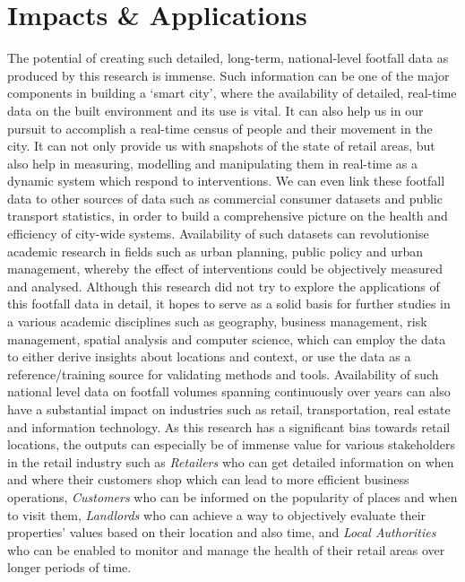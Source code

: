 \section{Impacts \& Applications}
The potential of creating such detailed, long-term, national-level footfall data as produced by this research is immense.
Such information can be one of the major components in building a `smart city', where the availability of detailed, real-time data on the built environment and its use is vital.
It can also help us in our pursuit to accomplish a real-time census of people and their movement in the city.
It can not only provide us with snapshots of the state of  retail areas, but also help in measuring, modelling and manipulating them in real-time as a dynamic system which respond to interventions.
We can even link these footfall data to other sources of data such as commercial consumer datasets and public transport statistics, in order to build a comprehensive picture on the health and efficiency of city-wide systems.
Availability of such datasets can revolutionise academic research in fields such as urban planning, public policy and urban management, whereby the effect of interventions could be objectively measured and analysed.
Although this research did not try to explore the applications of this footfall data in detail, it hopes to serve as a solid basis for further studies in a various academic disciplines such as geography, business management, risk management, spatial analysis and computer science, which can employ the data to either derive insights about locations and context, or use the data as a reference/training source for validating methods and tools.
Availability of such national level data on footfall volumes spanning continuously over years can also have a substantial impact on industries such as retail, transportation, real estate and information technology.
As this research has a significant bias towards retail locations, the outputs can especially be of immense value for various stakeholders in the retail industry such as \textit{Retailers} who can get detailed information on when and where their customers shop which can lead to more efficient business operations, \textit{Customers} who can be informed on the popularity of places and when to visit them, \textit{Landlords} who can achieve a way to objectively evaluate their properties' values based on their location and also time, and \textit{Local Authorities} who can be enabled to monitor and manage the health of their retail areas over longer periods of time.
